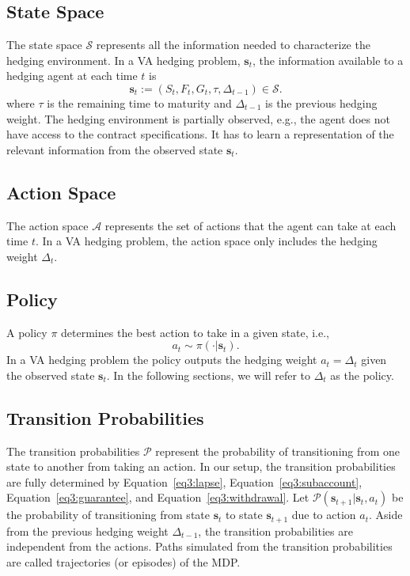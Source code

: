 \subsection{State Space}

The state space $\mathcal{S}$ represents all the information needed to characterize the hedging environment.
In a VA hedging problem, $\mathbf{s}_t$, the information available to a hedging agent at each time $t$ is 
$$\mathbf{s}_t := (S_t, F_t, G_t, \tau, \Delta_{t-1}) \in \mathcal{S}.$$
where $\tau$ is the remaining time to maturity and $\Delta_{t-1}$ is the previous hedging weight.
The hedging environment is partially observed, e.g., the agent does not have access to the contract specifications.
It has to learn a representation of the relevant information from the observed state $\mathbf{s}_t$.

\subsection{Action Space}

The action space $\mathcal{A}$ represents the set of actions that the agent can take at each time $t$.
In a VA hedging problem, the action space only includes the hedging weight $\Delta_t$.

\subsection{Policy}

A policy $\pi$ determines the best action to take in a given state, i.e.,
$$a_t \sim \pi(\cdot|\mathbf{s}_t).$$
In a VA hedging problem the policy outputs the hedging weight $a_t = \Delta_t$ given the observed state $\mathbf{s}_t$.
In the following sections, we will refer to $\Delta_t$ as the policy.

\subsection{Transition Probabilities}

The transition probabilities $\mathcal{P}$ represent the probability of transitioning from one state to another from taking an action.
In our setup, the transition probabilities are fully determined by Equation~\ref{eq3:lapse}, Equation~\ref{eq3:subaccount}, Equation~\ref{eq3:guarantee}, and Equation~\ref{eq3:withdrawal}.
Let $\mathcal{P}(\mathbf{s}_{t+1}|\mathbf{s}_t, a_t)$ be the probability of transitioning from state $\mathbf{s}_t$ to state $\mathbf{s}_{t+1}$ due to action $a_t$.
Aside from the previous hedging weight $\Delta_{t-1}$, the transition probabilities are independent from the actions.
Paths simulated from the transition probabilities are called trajectories (or episodes) of the MDP.

